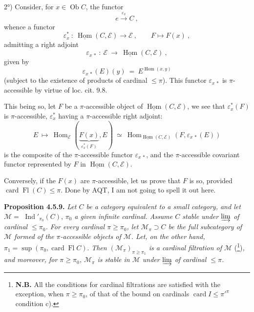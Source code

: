 \documentclass[11pt]{article}
\newcommand{\printedpage}[1]{\marginpar{\footnotesize p.~#1}}
\newcommand{\msp}[1]{\marginpar{\footnotesize [#1]}}
\newcommand{\Ob}{\operatorname{Ob}}
\newcommand{\card}{\operatorname{card}}
\newcommand{\Fl}{\operatorname{Fl}}
\newcommand{\Hom}{\operatorname{Hom}}
\newcommand{\uHom}{\underline{\operatorname{Hom}}}
\newcommand{\Ind}{\operatorname{Ind}}
\begin{document}
\msp{page 120}

2°) Consider, for $x \in \Ob C$, the functor
\[
e \xrightarrow{\ \varepsilon_x\ } C \ ,
\]
whence a functor
\[
\varepsilon_x^* \ : \ \uHom(C,\mathcal{E}) \longrightarrow \mathcal{E} \ , \qquad F \longmapsto F(x) \ ,
\]
admitting a right adjoint
\[
\varepsilon_{x\,*} \ : \ \mathcal{E} \ \longrightarrow \ \uHom(C,\mathcal{E}) \ ,
\]
given by
\[
\varepsilon_{x\,*}(E)(y) \ = \ E^{\Hom(x,y)}
\]
(subject to the existence of products of cardinal $\leqslant \pi$). This functor $\varepsilon_{x\,*}$ is $\pi$-accessible by virtue of loc. cit. 9.8.

This being so, let $F$ be a $\pi$-accessible object of $\uHom(C,\mathcal{E})$, we see that $\varepsilon_x^*(F)$ is $\pi$-accessible, $\varepsilon_x^*$ having a $\pi$-accessible right adjoint:
\[
E \ \longmapsto \ \Hom_{\mathcal{E}}(\underbrace{F(x)}_{\varepsilon_x^*(F)}, E) \ \simeq \ \Hom_{\uHom(C,\mathcal{E})}(F, \varepsilon_{x\,*}(E))
\]
\printedpage{36}
is the composite of the $\pi$-accessible functor $\varepsilon_{x\,*}$, and the $\pi$-accessible covariant functor represented by $F$ in $\uHom(C,\mathcal{E})$.

Conversely, if the $F(x)$ are $\pi$-accessible, let us prove that $F$ is so, provided $\card \Fl(C) \leqslant \pi$. Done by AQT, I am not going to spell it out here.

\msp{page 121}

\textbf{Proposition 4.5.9.} \textit{Let $C$ be a category equivalent to a small category, and let $\mathcal{M} = $} $\Ind'_{\pi_0}(C)$, \textit{$\pi_0$ a given infinite cardinal. Assume $C$ stable under $\varinjlim$ of cardinal $\leqslant \pi_0$. For every cardinal $\pi \geqslant \pi_0$, let $\mathcal{M}_\pi \supset C$ be the full subcategory of $\mathcal{M}$ formed of the $\pi$-accessible objects of $\mathcal{M}$. Let, on the other hand,} $\pi_1 = \sup(\pi_0, \card \Fl C)$. \textit{Then $(\mathcal{M}_\pi)_{\pi \geqslant \pi_1}$ is a cardinal filtration of $\mathcal{M}$} (\footnote{\textbf{N.B.} All the conditions for cardinal filtrations are satisfied with the exception, when $\pi \geqslant \pi_0$, of that of the bound on cardinals $\card I \leqslant \pi'^{\pi}$ condition c).})\textit{, and moreover, for $\pi \geqslant \pi_0$, $\mathcal{M}_\pi$ is stable in $\mathcal{M}$ under $\varinjlim$ of cardinal $\leqslant \pi$.}
\end{document}
